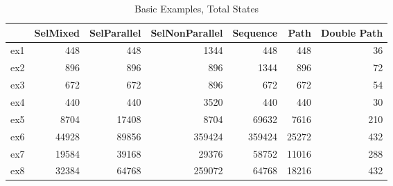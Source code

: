 \begin{table}
\centering
\caption{Basic Examples, Total States}
\label{b_e_total}
\begin{tabular}{lrrrrrr}
\toprule
{} &  SelMixed &  SelParallel &  SelNonParallel &  Sequence &   Path &  Double Path \\
\midrule
ex1 &       448 &          448 &            1344 &       448 &    448 &           36 \\
ex2 &       896 &          896 &             896 &      1344 &    896 &           72 \\
ex3 &       672 &          672 &             896 &       672 &    672 &           54 \\
ex4 &       440 &          440 &            3520 &       440 &    440 &           30 \\
ex5 &      8704 &        17408 &            8704 &     69632 &   7616 &          210 \\
ex6 &     44928 &        89856 &          359424 &    359424 &  25272 &          432 \\
ex7 &     19584 &        39168 &           29376 &     58752 &  11016 &          288 \\
ex8 &     32384 &        64768 &          259072 &     64768 &  18216 &          432 \\
\bottomrule
\end{tabular}
\end{table}
